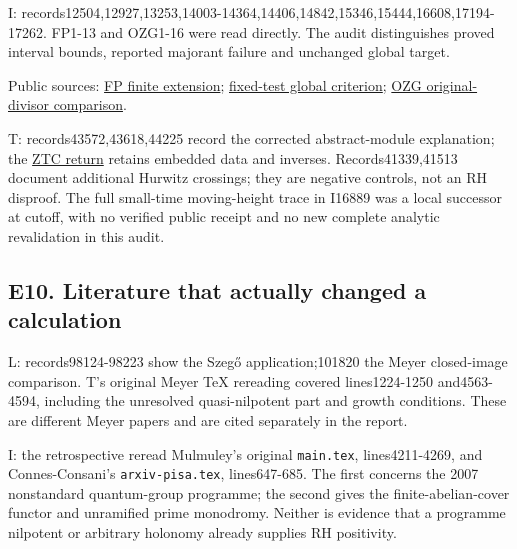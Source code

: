 \documentclass[
  british,
  11pt,
  a4paper,
]{article}
\begin{document}
I:
records12504,12927,13253,14003-14364,14406,14842,15346,15444,16608,17194-17262.
FP1-13 and OZG1-16 were read directly. The audit distinguishes proved
interval bounds, reported majorant failure and unchanged global target.

Public sources:
\href{https://github.com/KokunoYumeto/zeta-function-research-reader/blob/e1dc06aa68bb810cf7d8b0006942f5b036b8b765/workbenches/splitzero-tandem/branches/tau-zero-prime-positivity/FINITE_PRIME_WINDOW_EXTENSION.md}{FP
finite extension};
\href{https://github.com/KokunoYumeto/zeta-function-research-reader/blob/e1dc06aa68bb810cf7d8b0006942f5b036b8b765/workbenches/splitzero-tandem/branches/tau-zero-prime-positivity/UNIVERSAL_PRIMITIVE_TRANSLATION_CRITERION.md}{fixed-test
global criterion};
\href{https://github.com/KokunoYumeto/zeta-function-research-reader/blob/e1dc06aa68bb810cf7d8b0006942f5b036b8b765/workbenches/splitzero-tandem/branches/tau-zero-prime-positivity/ORIGINAL_ZETA_GAUSSIAN_TRANSLATION_RECONSTRUCTION.md}{OZG
original-divisor comparison}.

T: records43572,43618,44225 record the corrected abstract-module
explanation; the
\href{https://github.com/KokunoYumeto/zeta-function-research-reader/blob/acd7016b8232a56f31ae3e69fb800571e8789080/workbenches/splitzero-tandem/continuations/20260923-retained-source-readers/original-zeta-full-boundary/CC_WEIL_BOUNDARY_READER.tex}{ZTC
return} retains embedded data and inverses. Records41339,41513 document
additional Hurwitz crossings; they are negative controls, not an RH
disproof. The full small-time moving-height trace in I16889 was a local
successor at cutoff, with no verified public receipt and no new complete
analytic revalidation in this audit.

\subsection{E10. Literature that actually changed a
calculation}\label{e10.-literature-that-actually-changed-a-calculation}

L: records98124-98223 show the Szegő application;101820 the Meyer
closed-image comparison. T's original Meyer TeX rereading covered
lines1224-1250 and4563-4594, including the unresolved quasi-nilpotent
part and growth conditions. These are different Meyer papers and are
cited separately in the report.

I: the retrospective reread Mulmuley's original \texttt{main.tex},
lines4211-4269, and Connes-Consani's \texttt{arxiv-pisa.tex},
lines647-685. The first concerns the 2007 nonstandard quantum-group
programme; the second gives the finite-abelian-cover functor and
unramified prime monodromy. Neither is evidence that a programme
nilpotent or arbitrary holonomy already supplies RH positivity.
\end{document}
